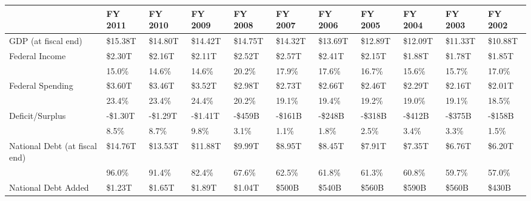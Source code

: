 \documentclass{article}
\begin{document}
    \begin{table}[H]
      \begin{tabular}{|l|l|l|l|l|l|l|l|l|l|l|}
      \hline
      & FY 2011 & FY 2010 & FY 2009 & FY 2008 & FY 2007 & FY 2006 & FY 2005 & FY 2004 & FY 2003 & FY 2002 \\ \hline
      GDP (at fiscal end) & \$15.38T & \$14.80T & \$14.42T & \$14.75T & \$14.32T & \$13.69T & \$12.89T & \$12.09T & \$11.33T & \$10.88T \\ \hline
      Federal Income & \$2.30T & \$2.16T & \$2.11T & \$2.52T & \$2.57T & \$2.41T & \$2.15T & \$1.88T & \$1.78T & \$1.85T \\
      & 15.0\% & 14.6\% & 14.6\% & 20.2\% & 17.9\% & 17.6\% & 16.7\% & 15.6\% & 15.7\% & 17.0\% \\ \hline
      Federal Spending & \$3.60T & \$3.46T & \$3.52T & \$2.98T & \$2.73T & \$2.66T & \$2.46T & \$2.29T & \$2.16T & \$2.01T \\
      & 23.4\% & 23.4\% & 24.4\% & 20.2\% & 19.1\% & 19.4\% & 19.2\% & 19.0\% & 19.1\% & 18.5\% \\ \hline
      Deficit/Surplus & -\$1.30T & -\$1.29T & -\$1.41T & -\$459B & -\$161B & -\$248B & -\$318B & -\$412B & -\$375B & -\$158B \\
      & 8.5\% & 8.7\% & 9.8\% & 3.1\% & 1.1\% & 1.8\% & 2.5\% & 3.4\% & 3.3\% & 1.5\% \\ \hline
      National Debt (at fiscal end) & \$14.76T & \$13.53T & \$11.88T & \$9.99T & \$8.95T & \$8.45T & \$7.91T & \$7.35T & \$6.76T & \$6.20T \\
      & 96.0\% & 91.4\% & 82.4\% & 67.6\% & 62.5\% & 61.8\% & 61.3\% & 60.8\% & 59.7\% & 57.0\% \\ \hline
      National Debt Added & \$1.23T & \$1.65T & \$1.89T & \$1.04T & \$500B & \$540B & \$560B & \$590B & \$560B & \$430B \\
      \hline
      \end{tabular}
    \end{table}
\end{document}

